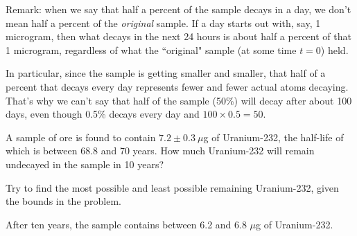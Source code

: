 \begin{solution}
Remark: when we say that half a percent of the sample decays in a day, we don't mean half a percent of the \emph{original} sample. If a day starts out with, say, 1 microgram, then what decays in the next 24 hours is about half a percent of that 1 microgram, regardless of what the ``original" sample (at some time $t=0$) held.

In particular, since the sample is getting smaller and smaller, that half of a percent that decays every day represents fewer and fewer actual atoms decaying. That's why we can't say that half of the sample (50\%) will decay after about 100 days, even though 0.5\% decays every day and $100\times 0.5 = 50$.
\end{solution}




\begin{question}
A sample of ore is found to contain $7.2 \pm 0.3~\mu$g of Uranium-232, the half-life of which is between 68.8 and 70 years. How much Uranium-232 will remain undecayed in the sample in 10 years?
\end{question}
\begin{hint}
Try to find the most possible and least possible remaining Uranium-232, given the bounds in the problem.
\end{hint}
\begin{answer}
After ten years, the sample contains between 6.2 and 6.8 $\mu$g of Uranium-232.
\end{answer}
